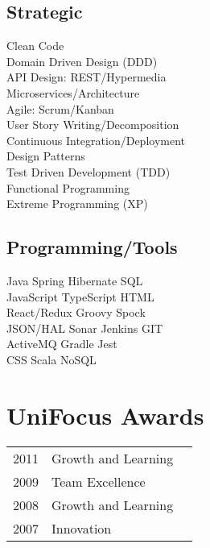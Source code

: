 \documentclass[]{deedy-resume}
\begin{document}
\begin{minipage}[t]{0.33\textwidth}
\subsection{Strategic}
Clean Code \\
Domain Driven Design (DDD) \\
API Design: REST/Hypermedia \\
Microservices/Architecture \\
Agile: Scrum/Kanban \\
User Story Writing/Decomposition \\
Continuous Integration/Deployment \\
Design Patterns \\
Test Driven Development (TDD) \\
Functional Programming \\
Extreme Programming (XP) \\
\sectionsep

\subsection{Programming/Tools}
Java \textbullet{} Spring \textbullet{} Hibernate \textbullet{} SQL \\
JavaScript \textbullet{} TypeScript \textbullet{} HTML \\ 
React/Redux \textbullet{} Groovy \textbullet{} Spock \\
JSON/HAL \textbullet{} Sonar \textbullet{} Jenkins \textbullet{} GIT \\
ActiveMQ \textbullet{} Gradle \textbullet{} Jest \\
CSS \textbullet{} Scala \textbullet{} NoSQL
\sectionsep


\section{UniFocus Awards} 
\begin{tabular}{rll}
2011	     & Growth and Learning\\
2009	     & Team Excellence\\
2008	     & Growth and Learning\\
2007     & Innovation  \\
\end{tabular}
\sectionsep

%
%

\end{minipage} 
\end{document}
